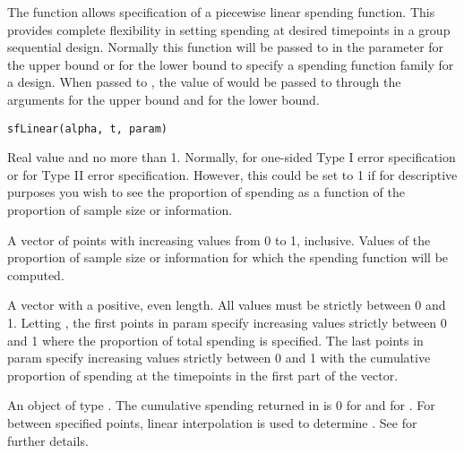 \begin{Description}\relax
The function  allows specification of a piecewise linear spending function.
This provides complete flexibility in setting spending at desired timepoints in a group sequential design.
Normally this function will be passed to  in the parameter 
 for the upper bound or
 for the lower bound to specify a spending function family for a design.
When passed to , the value of  would be passed to  through the  arguments  for the upper bound and  for the lower bound.
\end{Description}
\begin{Usage}
\begin{verbatim}
sfLinear(alpha, t, param)
\end{verbatim}
\end{Usage}
\begin{Arguments}
\begin{ldescription}
\item[\code{alpha}] Real value  and no more than 1. Normally, 
 for one-sided Type I error specification
or  for Type II error specification. However, this could be set to 1 if for descriptive purposes you wish to see the proportion of spending as a function of the proportion of sample size or information.
\item[\code{t}] A vector of points with increasing values from 0 to 1, inclusive. Values of the proportion of 
sample size or information for which the spending function will be computed.
\item[\code{param}] A vector with a positive, even length. All values must be strictly between 0 and 1.
Letting , the first  points in param specify increasing values strictly between 0 and 1 where the proportion of total spending is specified. 
The last  points in param specify increasing values strictly between 0 and 1 with the cumulative proportion of spending at the timepoints in the first part of the vector.
\end{ldescription}
\end{Arguments}
\begin{Value}
An object of type . 
The cumulative spending returned in  is 0 for  and  for . 
For  between specified points, linear interpolation is used to determine . 
See  for further details.
\end{Value}
